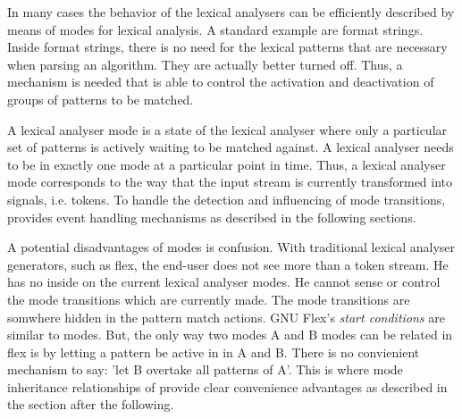 In many cases the behavior of the lexical analysers can be efficiently
described by means of modes for lexical analysis. A standard example are
format strings. Inside format strings, there is no need for the lexical
patterns that are necessary when parsing an algorithm. They are actually
better turned off. Thus, a mechanism is needed that is able to control the
activation and deactivation of groups of patterns to be matched.

A lexical analyser mode is a state of the lexical analyser where only a
particular set of patterns is actively waiting to be matched against.  A
lexical analyser needs to be in exactly one mode at a particular point in
time. Thus, a lexical analyser mode corresponds to the way that the
input stream is currently transformed into signals, i.e. tokens. To handle
the detection and influencing of mode transitions, {\Quex} provides
event handling mechanisms as described in the following sections.

A potential disadvantages of modes is confusion. With traditional lexical
analyser generators, such as flex, the end-user does not see more than a token
stream. He has no inside on the current lexical analyser modes. He cannot
sense or control the mode transitions which are currently made. The mode
transitions are somwhere hidden in the pattern match actions.  GNU Flex's {\it
start conditions} are similar to modes. But, the only way two modes A and B
modes can be related in flex is by letting a pattern be active in in A and
B. There is no convienient mechanism to say: 'let B overtake all patterns of A'.
This is where mode inheritance relationships of {\Quex} provide clear 
convenience advantages as described in the section after the following.


